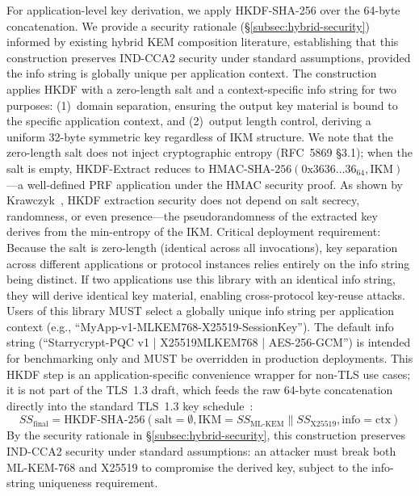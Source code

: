 \documentclass[11pt,a4paper]{article}
\def\textbf#1{#1}%
\def\texttt#1{#1}%
\def\emph#1{#1}%
\begin{document}
For application-level key derivation, we apply HKDF-SHA-256 over the 64-byte concatenation. We provide a security rationale (\S\ref{subsec:hybrid-security}) informed by existing hybrid KEM composition literature, establishing that this construction preserves IND-CCA2 security under standard assumptions, provided the info string is globally unique per application context. The construction applies HKDF with a zero-length salt and a context-specific info string for two purposes: (1)~\textbf{domain separation}, ensuring the output key material is bound to the specific application context, and (2)~\textbf{output length control}, deriving a uniform 32-byte symmetric key regardless of IKM structure. \textbf{We note that the zero-length salt does not inject cryptographic entropy} (RFC~5869 \S3.1); when the salt is empty, HKDF-Extract reduces to $\text{HMAC-SHA-256}(\text{0x3636\ldots36}_{64}, \text{IKM})$---a well-defined PRF application under the HMAC security proof. As shown by Krawczyk~\cite{krawczyk2010hkdf}, HKDF extraction security does not depend on salt secrecy, randomness, or even presence---the pseudorandomness of the extracted key derives from the min-entropy of the IKM. \textbf{Critical deployment requirement:} Because the salt is zero-length (identical across all invocations), key separation across different applications or protocol instances relies \emph{entirely} on the info string being distinct. If two applications use this library with an identical info string, they will derive identical key material, enabling cross-protocol key-reuse attacks. Users of this library MUST select a globally unique info string per application context (e.g., \texttt{``MyApp-v1-MLKEM768-X25519-SessionKey''}). The default info string (\texttt{``Starrycrypt-PQC v1 | X25519MLKEM768 | AES-256-GCM''}) is intended for benchmarking only and MUST be overridden in production deployments. This HKDF step is an application-specific convenience wrapper for non-TLS use cases; it is \textbf{not part of the TLS~1.3 draft}, which feeds the raw 64-byte concatenation directly into the standard TLS~1.3 key schedule~\cite{rfc8446}:
\begin{equation}
SS_{\text{final}} = \text{HKDF-SHA-256}(\text{salt}=\emptyset, \text{IKM}=SS_{\text{ML-KEM}} \parallel SS_{\text{X25519}}, \text{info}=\text{ctx})
\label{eq:hybrid}
\end{equation}
By the security rationale in \S\ref{subsec:hybrid-security}, this construction preserves IND-CCA2 security under standard assumptions: an attacker must break \emph{both} ML-KEM-768 and X25519 to compromise the derived key, subject to the info-string uniqueness requirement.
\end{document}
